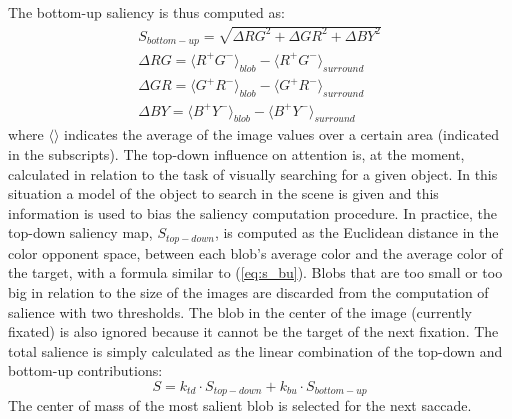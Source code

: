 \documentclass{llncs}
\begin{document}
The bottom-up saliency is thus computed as:
\begin{eqnarray}
	S_{bottom-up}=\sqrt{\Delta RG^2 + \Delta GR^2+ \Delta BY^2} \\
	\Delta RG={\langle R^+G^- \rangle}_{blob} - {\langle R^+G^- \rangle}_{surround} \\
	\Delta GR={\langle G^+R^- \rangle}_{blob} - {\langle G^+R^- \rangle}_{surround} \\
	\Delta BY={\langle B^+Y^- \rangle}_{blob} - {\langle B^+Y^- \rangle}_{surround}
	\label{eq:s_bu}
\end{eqnarray}
\noindent where $\langle \rangle$ indicates the average of the image values
over a certain area (indicated in the subscripts).
The top-down influence on attention is, at the
moment, calculated in relation to the task of visually
searching for a given object. In this situation a model of
the object to search in the scene is given and this information is used to bias the saliency
computation procedure. In practice, the top-down
saliency map, $S_{top-down}$, is computed as the Euclidean distance in
the color opponent space, between each blob's average
color and the average color of the target, with a formula
similar to (\ref{eq:s_bu}).
Blobs that are too small or too big in relation to the
size of the images are discarded from the
computation of salience with two thresholds. The blob in
the center of the image (currently fixated) is also ignored
because it cannot be the target of the next fixation.
The total salience is simply calculated as the linear
combination of the top-down and bottom-up
contributions:
\begin{equation}
	S=k_{td} \cdot S_{top-down}+k_{bu} \cdot S_{bottom-up}
	\label{eq:s_tot}
\end{equation}
The center of mass of the most salient blob is selected for the next
saccade.

\end{document}
